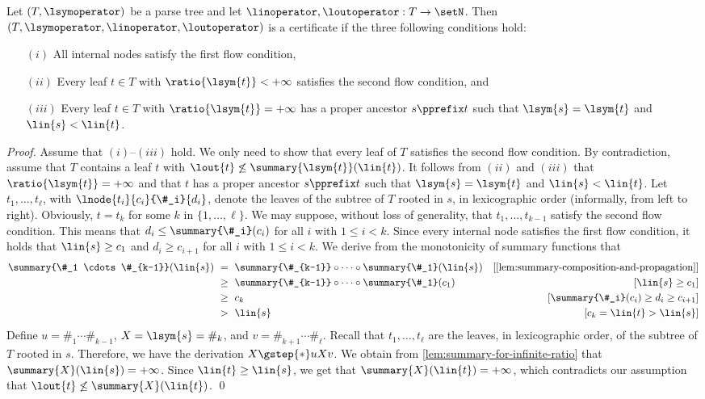 \begin{lemma}
  \label{fact:certificate-decidable}
  Let $(T, \lsymoperator)$ be a parse tree and
  let $\linoperator, \loutoperator: T \to \setN$.
  Then $(T, \lsymoperator, \linoperator, \loutoperator)$ is a certificate if
  the three following conditions hold:
  \begin{enumerate}
  \item[$(i)$]
    All internal nodes satisfy the first flow condition,
  \item[$(ii)$]
    Every leaf $t \in T$ with $\ratio{\lsym{t}} < +\infty$
    satisfies the second flow condition, and
  \item[$(iii)$]
    Every leaf $t \in T$ with $\ratio{\lsym{t}} = +\infty$
    has a proper ancestor $s \pprefix t$ such that
    $\lsym{s} = \lsym{t}$ and $\lin{s} < \lin{t}$.
  \end{enumerate}
\end{lemma}
\begin{proof}
  Assume that $(i)$--$(iii)$ hold.
  We only need to show that every leaf of $T$ satisfies
  the second flow condition.
  By contradiction, assume that $T$ contains a leaf $t$ with
  $\lout{t} \not\leq \summary{\lsym{t}}(\lin{t})$.
  It follows from $(ii)$ and $(iii)$ that $\ratio{\lsym{t}} = +\infty$
  and that $t$ has a proper ancestor $s \pprefix t$ such that
  $\lsym{s} = \lsym{t}$ and $\lin{s} < \lin{t}$.
  Let $t_1, \ldots, t_\ell$,
  with $\lnode{t_i}{c_i}{\#_i}{d_i}$,
  denote the leaves of the subtree of $T$ rooted in $s$,
  in lexicographic order (informally, from left to right).
  Obviously, $t = t_k$ for some $k$ in $\{1, \ldots, \ell\}$.
  We may suppose, without loss of generality,
  that $t_1, \ldots, t_{k-1}$ satisfy the second flow condition.
  This means that
  $d_i \leq \summary{\#_i}(c_i)$ for all $i$ with $1 \leq i < k$.
  Since every internal node satisfies the first flow condition,
  it holds that $\lin{s} \geq c_1$ and
  $d_i \geq c_{i+1}$ for all $i$ with $1 \leq i < k$.
  We derive from the monotonicity of summary functions that
  \begin{align*}
    \summary{\#_1 \cdots \#_{k-1}}(\lin{s})
    & \ = \ \summary{\#_{k-1}} \circ \cdots \circ \summary{\#_1}(\lin{s}) & [\text{\cref{lem:summary-composition-and-propagation}}]\\
    & \ \geq \ \summary{\#_{k-1}} \circ \cdots \circ \summary{\#_1}(c_1) & [\lin{s} \geq c_1]\\
    & \ \geq \ c_k & [\summary{\#_i}(c_i) \geq d_i \geq c_{i+1}]\\
    & \ > \ \lin{s} & [c_k = \lin{t} > \lin{s}]
  \end{align*}
  Define $u = \#_1 \cdots \#_{k-1}$, $X = \lsym{s} = \#_k$, and
  $v = \#_{k+1} \cdots \#_\ell$.
  Recall that $t_1, \ldots, t_\ell$ are the leaves,
  in lexicographic order,
  of the subtree of $T$ rooted in $s$.
  Therefore, we have the derivation $X \gstep{*} u X v$.
  We obtain from \cref{lem:summary-for-infinite-ratio} that
  $\summary{X}(\lin{s}) = +\infty$.
  Since $\lin{t} \geq \lin{s}$, we get that $\summary{X}(\lin{t}) = +\infty$,
  which contradicts our assumption that
  $\lout{t} \not\leq \summary{X}(\lin{t})$.
  \qed
\end{proof}
